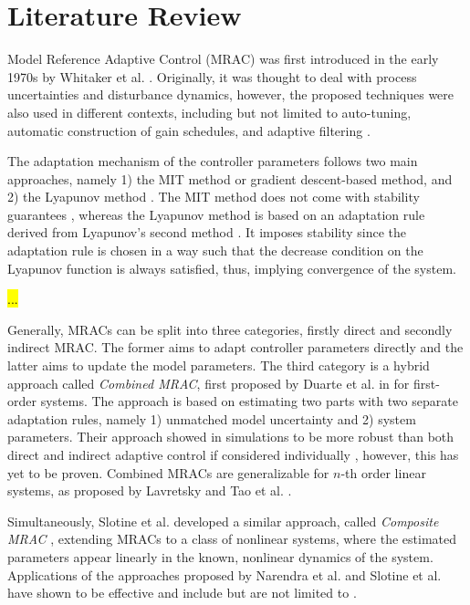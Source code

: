 \section{Literature Review}
Model Reference Adaptive Control (MRAC) was first introduced in the early 1970s by Whitaker et al. \cite{whitakerDesignModelReference1958}. Originally, it was thought to deal with process uncertainties and disturbance dynamics, however, the proposed techniques were also used in different contexts, including but not limited to auto-tuning, automatic construction of gain schedules, and adaptive filtering \cite{astromTheoryApplicationsAdaptive1983, astromHistoryAdaptiveControl2014}.

The adaptation mechanism of the controller parameters follows two main approaches, namely 1) the MIT method or gradient descent-based method, and 2) the Lyapunov method \cite{astromAdaptiveControl2008}. The MIT method does not come with stability guarantees \cite{mareelsRevisitingMitRule1987}, whereas the Lyapunov method is based on an adaptation rule derived from Lyapunov's second method \cite{shackclothSynthesisModelReference1965}. It imposes stability since the adaptation rule is chosen in a way such that the decrease condition on the Lyapunov function is always satisfied, thus, implying convergence of the system.

\hl{...}

Generally, MRACs can be split into three categories, firstly direct and secondly indirect MRAC. The former aims to adapt controller parameters directly and the latter aims to update the model parameters. The third category is a hybrid approach called \textit{Combined MRAC}, first proposed by Duarte et al. in \cite{duarteCombinedDirectIndirect1989} for first-order systems. The approach is based on estimating two parts with two separate adaptation rules, namely 1) unmatched model uncertainty and 2) system parameters. Their approach showed in simulations to be more robust than both direct and indirect adaptive control if considered individually \cite{narendraRobustAdaptiveControl1988}, however, this has yet to be proven. Combined MRACs are generalizable for $n$-th order linear systems, as proposed by Lavretsky and Tao et al. \cite{lavretskyCombinedCompositeModel2009, taoAdaptiveControlSystems2013}.

Simultaneously, Slotine et al. developed a similar approach, called \textit{Composite MRAC} \cite{slotineAdaptiveControlRobot1987a, slotineAdaptiveRobotControl1987, slotineAppliedNonlinearControl1991}, extending MRACs to a class of nonlinear systems, where the estimated parameters appear linearly in the known, nonlinear dynamics of the system. Applications of the approaches proposed by Narendra et al. and Slotine et al. have shown to be effective and include but are not limited to \cite{duarte-mermoudExperimentalEvaluationCombined2002,duarte-mermoudControlLongitudinalMovement2005}.

